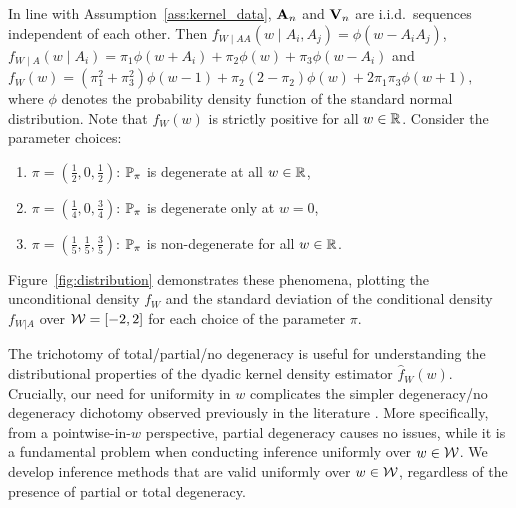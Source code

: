 In line with Assumption~\ref{ass:kernel_data}, $\bA_n$ and $\bV_n$ are i.i.d.\
sequences independent of each other.
Then
$f_{W \mid AA}(w \mid A_i, A_j) = \phi(w - A_i A_j)$,\,
$f_{W \mid A}(w \mid A_i) = \pi_1 \phi(w + A_i) + \pi_2 \phi(w)
+ \pi_3 \phi(w - A_i)$
and
$f_W(w) = (\pi_1^2 + \pi_3^2) \phi(w-1) + \pi_2 (2 - \pi_2) \phi(w) + 2
\pi_1 \pi_3 \phi(w+1),$
where $\phi$ denotes the probability density function of
the standard normal distribution.
Note that $f_W(w)$ is strictly positive for all $w \in \R$.
Consider the parameter choices:
%
\begin{enumerate}[label=(\roman*)]\onehalfspacing

  \item $\pi = \left( \frac{1}{2}, 0, \frac{1}{2} \right)$:\quad
    $\P_\pi$ is degenerate at all $w \in \R$,

  \item $\pi = \left( \frac{1}{4}, 0, \frac{3}{4} \right)$:\quad
    $\P_\pi$ is degenerate only at $w=0$,

  \item $\pi = \left( \frac{1}{5}, \frac{1}{5}, \frac{3}{5} \right)$:\quad
    $\P_\pi$ is non-degenerate for all $w \in \R$.

\end{enumerate}
%
Figure~\ref{fig:distribution} demonstrates these phenomena,
plotting the unconditional density $f_W$
and the standard deviation of the conditional density $f_{W|A}$
over $\cW = [-2,2]$ for each choice of the parameter $\pi$.

The trichotomy of total/partial/no  degeneracy is useful for understanding the
distributional properties of the dyadic kernel density estimator
$\hat{f}_W(w)$. Crucially, our need for uniformity in $w$ complicates the
simpler degeneracy/no degeneracy dichotomy observed previously in the literature
\citep{graham2022kernel}.
More specifically,
from a pointwise-in-$w$ perspective,
partial degeneracy causes no issues,
while it is a fundamental problem
when conducting inference uniformly over $w \in \cW$.
We develop inference methods
that are valid uniformly over $w \in \cW$,
regardless of the presence of partial or total degeneracy.

